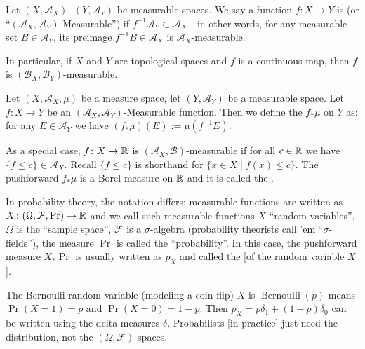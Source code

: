 

\begin{definition}\label{defn:lec21:measurable-function}
Let $(X,\mathcal{A}_{X})$, $(Y,\mathcal{A}_{Y})$ be measurable spaces.
We say a function $f\colon X\to Y$ is  (or ``$(\mathcal{A}_{X},\mathcal{A}_{Y})$-Measurable'')
if $f^{-1}\mathcal{A}_{Y}\subset\mathcal{A}_{X}$---in other words, for
any measurable set $B\in\mathcal{A}_{Y}$, its preimage
$f^{-1}B\in\mathcal{A}_{X}$ is $\mathcal{A}_{X}$-measurable.

In particular, if $X$ and $Y$ are topological spaces and $f$ is a
continuous map, then $f$ is $(\mathcal{B}_{X},\mathcal{B}_{Y})$-measurable.
\end{definition}

\begin{definition}
Let $(X,\mathcal{A}_{X},\mu)$ be a measure space, let
$(Y,\mathcal{A}_{Y})$ be a measurable space. Let $f\colon X\to Y$ be
an $(\mathcal{A}_{X},\mathcal{A}_{Y})$-Measurable function. Then we
define the  $f_{*}\mu$ on $Y$ as: for any
$E\in\mathcal{A}_{Y}$ we have $(f_{*}\mu)(E):=\mu(f^{-1}E)$.
\end{definition}

\begin{node}
As a special case, $f\colon X\to\mathbb{R}$ is
$(\mathcal{A}_{X},\mathcal{B})$-measurable if for all $c\in\mathbb{R}$ we
have $\{f\leq c\}\in\mathcal{A}_{X}$. Recall $\{f\leq c\}$ is
shorthand for $\{x\in X\mid f(x)\leq c\}$. The pushforward $f_{*}\mu$
is a Borel measure on $\mathbb{R}$ and it is called the .
\end{node}

\begin{remark}
In probability theory, the notation differs: measurable functions are
written as $X\colon(\Omega,\mathcal{F},\Pr)\to\mathbb{R}$ and we call such
measurable functions $X$ ``random variables'', $\Omega$ is the
``sample space'', $\mathcal{F}$ is a $\sigma$-algebra (probability
theorists call 'em ``$\sigma$-fields''), the measure $\Pr$ is called
the ``probability''. In this case, the pushforward measure $X_{*}\Pr$
is usually written as $p_{X}$ and called the  [of
  the random variable $X$].

The Bernoulli random variable (modeling a coin flip) $X$ is
$\operatorname{Bernoulli}(p)$ means $\Pr(X=1)=p$ and
$\Pr(X=0)=1-p$. Then $p_{X}=p\delta_{1}+(1-p)\delta_{0}$ can be
written using the delta measures $\delta$. Probabilists [in practice] just need the
distribution, not the $(\Omega,\mathcal{F})$ spaces.
\end{remark}

